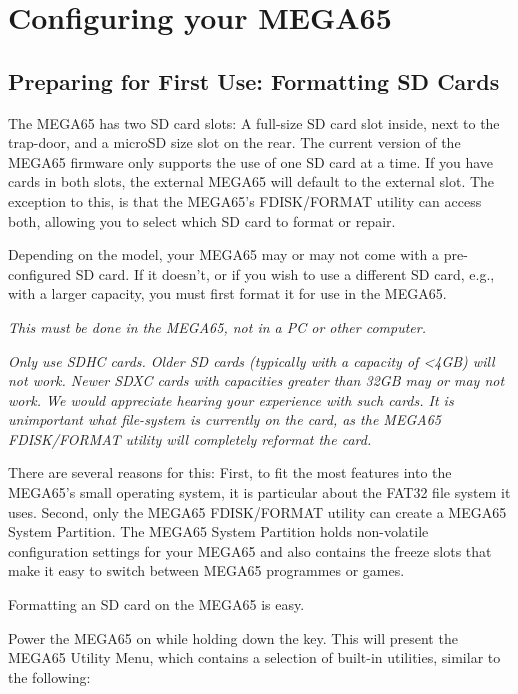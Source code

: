 \chapter{Configuring your MEGA65}
\label{cha:configuring}

\section{Preparing for First Use: Formatting SD Cards}

The MEGA65 has two SD card slots: A full-size SD card slot inside, next to
the trap-door, and a microSD size slot on the rear.  The current version
of the MEGA65 firmware only supports the use of one SD card at a time.
If you have cards in both slots, the external MEGA65 will default to the external slot. The exception to this, is that the MEGA65's FDISK/FORMAT
utility can access both, allowing you to select which SD card to format or
repair.

Depending on the model, your MEGA65 may or may not come with a pre-configured SD card. If it doesn't, or if you wish to use a different SD card, e.g., with a
larger capacity, you must first format it for use in the MEGA65.

{\em This must be done in the MEGA65, not in a PC or other computer.}

{\em Only use SDHC cards. Older SD cards (typically with
  a capacity of <4GB) will not work. Newer SDXC cards with
  capacities greater than 32GB may or may not work. We would
  appreciate hearing your experience with such cards. It is unimportant
  what file-system is currently on the card, as the MEGA65
  FDISK/FORMAT utility will completely reformat the card.}

There are several reasons for this: First, to fit the most
features into the MEGA65's small operating system, it is
particular about the FAT32 file system it uses. Second, only the
MEGA65 FDISK/FORMAT utility can create a MEGA65 System Partition. The
MEGA65 System Partition holds non-volatile configuration settings for
your MEGA65 and also contains the freeze slots that make it easy to
switch between MEGA65 programmes or games.

Formatting an SD card on the MEGA65 is easy.

Power the MEGA65 on while holding down the  key.
This will present the MEGA65 Utility Menu, which contains a
selection of built-in utilities, similar to the following:

